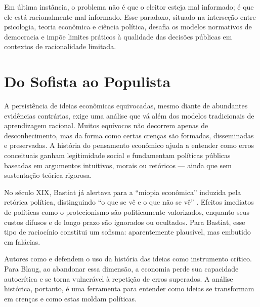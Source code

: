 Em última instância, o problema não é que o eleitor esteja mal informado; é que ele está racionalmente mal informado. Esse paradoxo, situado na interseção entre psicologia, teoria econômica e ciência política, desafia os modelos normativos de democracia e impõe limites práticos à qualidade das decisões públicas em contextos de racionalidade limitada.

\section{Do Sofista ao Populista} %


A persistência de ideias econômicas equivocadas, mesmo diante de abundantes evidências contrárias, exige uma análise que vá além dos modelos tradicionais de aprendizagem racional. Muitos equívocos não decorrem apenas de desconhecimento, mas da forma como certas crenças são formadas, disseminadas e preservadas. A história do pensamento econômico ajuda a entender como erros conceituais ganham legitimidade social e fundamentam políticas públicas baseadas em argumentos intuitivos, morais ou retóricos — ainda que sem sustentação teórica rigorosa.


No século XIX, Bastiat já alertava para a ``miopia econômica'' induzida pela retórica política, distinguindo ``o que se vê e o que não se vê'' \cite{bastiat1859sofismas}. Efeitos imediatos de políticas como o protecionismo são politicamente valorizados, enquanto seus custos difusos e de longo prazo são ignorados ou ocultados. Para Bastiat, esse tipo de raciocínio constitui um sofisma: aparentemente plausível, mas embutido em falácias.

Autores como  e  defendem o uso da história das ideias como instrumento crítico. Para Blaug, ao abandonar essa dimensão, a economia perde sua capacidade autocrítica e se torna vulnerável à repetição de erros superados. A análise histórica, portanto, é uma ferramenta para entender como ideias se transformam em crenças e como estas moldam políticas.

